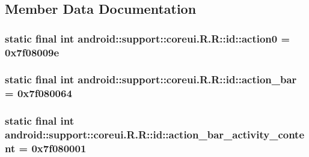 \subsection{Member Data Documentation}
\hypertarget{classandroid_1_1support_1_1coreui_1_1_r_1_1id_f8af6009a6cbcf10af5fad6b8be0d5a2}{
\subsubsection[{action0}]{\setlength{\rightskip}{0pt plus 5cm}static final int android::support::coreui.R.R::id::action0 = 0x7f08009e}}
\label{classandroid_1_1support_1_1coreui_1_1_r_1_1id_f8af6009a6cbcf10af5fad6b8be0d5a2}


\hypertarget{classandroid_1_1support_1_1coreui_1_1_r_1_1id_4098a170f21b0752ee9dd90052e05d05}{
\subsubsection[{action\_\-bar}]{\setlength{\rightskip}{0pt plus 5cm}static final int android::support::coreui.R.R::id::action\_\-bar = 0x7f080064}}
\label{classandroid_1_1support_1_1coreui_1_1_r_1_1id_4098a170f21b0752ee9dd90052e05d05}


\hypertarget{classandroid_1_1support_1_1coreui_1_1_r_1_1id_a3bbf275b72f4114fcde9ed254699045}{
\subsubsection[{action\_\-bar\_\-activity\_\-content}]{\setlength{\rightskip}{0pt plus 5cm}static final int android::support::coreui.R.R::id::action\_\-bar\_\-activity\_\-content = 0x7f080001}}
\label{classandroid_1_1support_1_1coreui_1_1_r_1_1id_a3bbf275b72f4114fcde9ed254699045}



